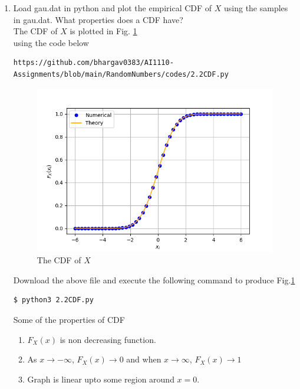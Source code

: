 \documentclass[journal,12pt,twocolumn]{IEEEtran}
\renewcommand\thesection{\arabic{section}}
\begin{document}
\begin{enumerate}[label=\thesection.\arabic*
,ref=\thesection.\theenumi]
\item
Load gau.dat in python and plot the empirical CDF of $X$ using the samples in gau.dat. What properties does a CDF have?\\
\solution The CDF of $X$ is plotted in Fig. \ref{fig:2.2}\\
using the code below
\begin{lstlisting}
https://github.com/bhargav0383/AI1110-Assignments/blob/main/RandomNumbers/codes/2.2CDF.py
\end{lstlisting}
\begin{figure}[!h]
\centering
\includegraphics[width=\columnwidth]{./figs/2.2CDF.png}
\caption{The CDF of $X$}
\label{fig:2.2}
\end{figure}
Download the above file and execute the following command to produce Fig.\ref{fig:2.2}
\begin{lstlisting}
$ python3 2.2CDF.py
\end{lstlisting}
Some of the properties of CDF 
\begin{enumerate}
    \item $F_X(x)$ is non decreasing function.
    \item As $x \to -\infty$, $F_X(x) \to 0$ and when $x \to \infty$, $F_X(x) \to 1$
    \item Graph is linear upto some region around $x=0$.
\end{enumerate}


\end{enumerate}
\end{document}
